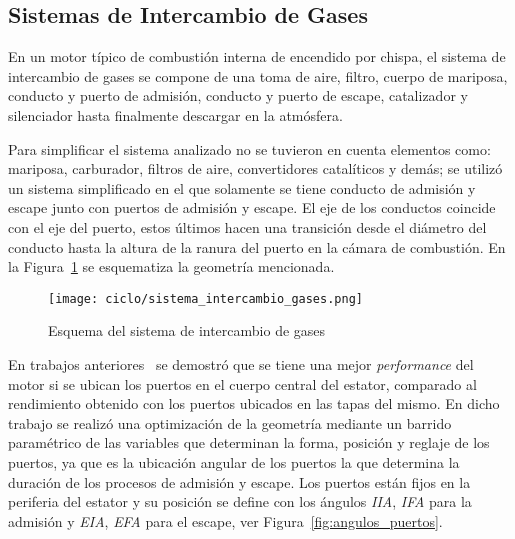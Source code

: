 


\subsection{Sistemas de Intercambio de Gases}
%
En un motor típico de combustión interna de encendido por chispa, el sistema de
intercambio de gases se compone de una toma de aire, filtro, cuerpo de
mariposa, conducto y puerto de admisión, conducto y puerto de escape,
catalizador y silenciador hasta finalmente descargar en la atmósfera.

Para simplificar el sistema analizado no se tuvieron en cuenta elementos como:
mariposa, carburador, filtros de aire, convertidores catalíticos y demás; se
utilizó un sistema simplificado en el que solamente se tiene conducto de
admisión y escape junto con puertos de admisión y escape.
%
El eje de los conductos coincide con el eje del puerto, estos últimos hacen una
transición desde el diámetro del conducto hasta la altura de la ranura del
puerto en la cámara de combustión.
%
En la Figura~\ref{fig:sistema_intercambio_gases} se esquematiza la geometría
mencionada.

\begin{figure}[h!]
    \centering
    \texttt{[image: ciclo/sistema\_intercambio\_gases.png]}
    \caption{Esquema del sistema de intercambio de gases}\label{fig:sistema_intercambio_gases}
\end{figure}


En trabajos anteriores~\parencite{lopez13} se demostró que se tiene una mejor
\emph{performance} del motor si se ubican los puertos en el cuerpo central del
estator, comparado al rendimiento obtenido con los puertos ubicados en las
tapas del mismo.
%
En dicho trabajo se realizó una optimización de la geometría mediante un
barrido paramétrico de las variables que determinan la forma, posición y
reglaje de los puertos, ya que es la ubicación angular de los puertos la que
determina la duración de los procesos de admisión y escape.
%
Los puertos están fijos en la periferia del estator y su posición se define con
los ángulos \emph{IIA}, \emph{IFA} para la admisión y \emph{EIA}, \emph{EFA}
para el escape, ver Figura~\ref{fig:angulos_puertos}.

